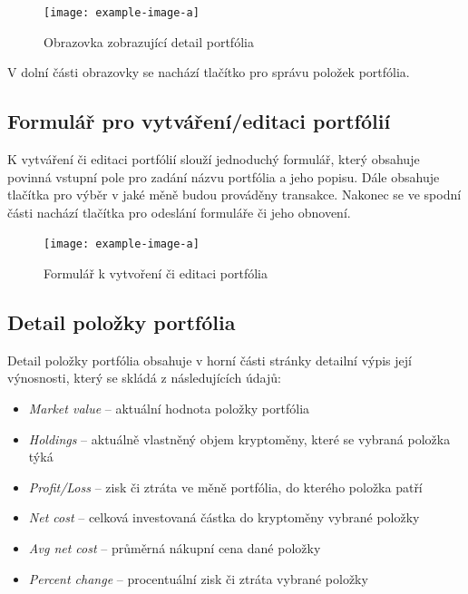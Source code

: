 \documentclass[12pt, a4paper]{article}
\begin{document}
    \begin{figure}[!ht]
        \centering
        {\texttt{[image: example-image-a]}}
        \caption{Obrazovka zobrazující detail portfólia}
        \label{fig:portfolio-detail}
    \end{figure}
    
    V dolní části obrazovky se nachází tlačítko pro správu položek portfólia.
    
    \subsection{Formulář pro vytváření/editaci portfólií}
    K vytváření či editaci portfólií slouží jednoduchý formulář, který obsahuje povinná vstupní pole pro zadání názvu portfólia a jeho popisu.
    Dále obsahuje tlačítka pro výběr v jaké měně budou prováděny transakce.
    Nakonec se ve spodní části nachází tlačítka pro odeslání formuláře či jeho obnovení.

    \begin{figure}[!ht]
        \centering
        {\texttt{[image: example-image-a]}}
        \caption{Formulář k vytvoření či editaci portfólia}
        \label{fig:portfolio-form}
    \end{figure}

    \subsection{Detail položky portfólia}
    Detail položky portfólia obsahuje v horní části stránky detailní výpis její výnosnosti, který se skládá z následujících údajů:
    \begin{itemize}
        \item \textit{Market value} -- aktuální hodnota položky portfólia
        \item \textit{Holdings} -- aktuálně vlastněný objem kryptoměny, které se vybraná položka týká
        \item \textit{Profit/Loss} -- zisk či ztráta ve měně portfólia, do kterého položka patří
        \item \textit{Net cost} -- celková investovaná částka do kryptoměny vybrané položky
        \item \textit{Avg net cost} -- průměrná nákupní cena dané položky
        \item \textit{Percent change} -- procentuální zisk či ztráta vybrané položky
    \end{itemize}
    
\end{document}
